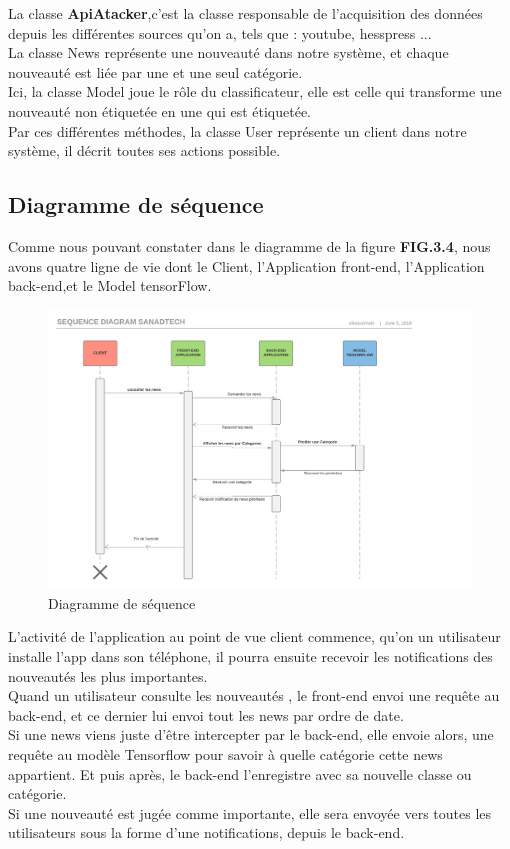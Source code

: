 La classe \textbf{ApiAtacker},c'est la classe responsable de l'acquisition des données depuis les différentes sources qu'on a, tels que : youtube, hesspress ...\\[0.2cm]
La classe News représente une nouveauté dans notre système, et chaque nouveauté est liée par une et une seul catégorie.\\[0.2cm]
Ici, la classe Model joue le rôle du classificateur, elle est celle qui transforme une nouveauté non étiquetée en une qui est  étiquetée.\\[0.2cm]
Par ces différentes méthodes, la classe User représente un client dans notre système, il décrit toutes ses actions possible.

\subsection{Diagramme de séquence}
Comme nous pouvant constater dans le diagramme de la figure \textbf{FIG.3.4}, nous avons quatre ligne de vie dont le  Client, l'Application front-end, l'Application back-end,et le  Model tensorFlow.
\begin{figure}[H]
	\includegraphics[scale=0.70]{Images/Sequence_Diagram_Sanadtech.png}
	\caption{Diagramme de séquence}
	\label{fig:sequence}
\end{figure}
L'activité de l'application au point de vue client commence, qu'on un utilisateur installe l'app dans son téléphone, il pourra ensuite recevoir les notifications des nouveautés les plus importantes.\\[0.2cm]
Quand un utilisateur consulte les nouveautés , le front-end envoi une requête au back-end, et ce dernier lui envoi tout les news par ordre de date.\\[0.2cm]
Si une news viens juste d'être intercepter par le back-end, elle envoie alors, une requête au modèle Tensorflow pour savoir à quelle catégorie cette news appartient. Et puis après, le back-end l'enregistre avec sa nouvelle classe ou catégorie.\\[0.4cm]
Si une nouveauté est jugée comme importante, elle sera envoyée vers toutes les utilisateurs sous la forme d'une notifications, depuis le back-end.\\[0.2cm]

